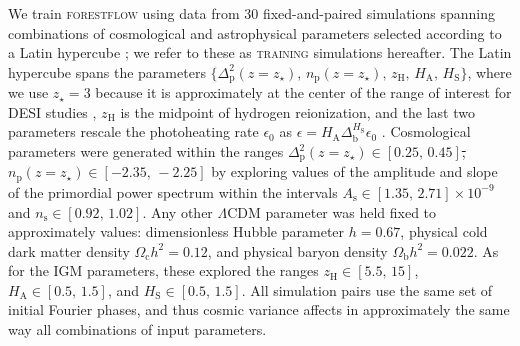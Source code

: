 \documentclass{aa}
\newcommand{\forestflow}{\textsc{forestflow}\xspace}
\newcommand{\lacehc}{\textsc{training}\xspace}
\providecommand{\DIFaddtex}[1]{{\protect\color{blue}\uwave{#1}}} %
\providecommand{\DIFdeltex}[1]{{\protect\color{red}\sout{#1}}}                      %
\providecommand{\DIFaddbegin}{} %
\providecommand{\DIFaddend}{} %
\providecommand{\DIFdelbegin}{} %
\providecommand{\DIFdelend}{} %
\providecommand{\DIFadd}[1]{\texorpdfstring{\DIFaddtex{#1}}{#1}} %
\providecommand{\DIFdel}[1]{\texorpdfstring{\DIFdeltex{#1}}{}} %
\newcommand{\DIFscaledelfig}{0.5}
\newlength{\DIFdelgraphicswidth} %
\newlength{\DIFdelgraphicsheight} %
\newcommand{\DIFaddincludegraphics}[2][]{{\color{blue}\fbox{\DIFOincludegraphics[#1]{#2}}}} %
\newcommand{\DIFdelincludegraphics}[2][]{%
\sbox{\DIFdelgraphicsbox}{\DIFOincludegraphics[#1]{#2}}%
\settoboxwidth{\DIFdelgraphicswidth}{\DIFdelgraphicsbox} %
\settoboxtotalheight{\DIFdelgraphicsheight}{\DIFdelgraphicsbox} %
\scalebox{\DIFscaledelfig}{%
\parbox[b]{\DIFdelgraphicswidth}{\usebox{\DIFdelgraphicsbox}\\[-\baselineskip] \rule{\DIFdelgraphicswidth}{0em}}\llap{\resizebox{\DIFdelgraphicswidth}{\DIFdelgraphicsheight}{%
\setlength{\unitlength}{\DIFdelgraphicswidth}%
\begin{picture}(1,1)%
\thicklines\linethickness{2pt} %
{\color[rgb]{1,0,0}\put(0,0){\framebox(1,1){}}}%
{\color[rgb]{1,0,0}\put(0,0){\line( 1,1){1}}}%
{\color[rgb]{1,0,0}\put(0,1){\line(1,-1){1}}}%
\end{picture}%
}\hspace*{3pt}}} %
} %
\DeclareRobustCommand{\DIFaddbegin}{\DIFOaddbegin \let\includegraphics\DIFaddincludegraphics} %
\DeclareRobustCommand{\DIFaddend}{\DIFOaddend \let\includegraphics\DIFOincludegraphics} %
\DeclareRobustCommand{\DIFdelbegin}{\DIFOdelbegin \let\includegraphics\DIFdelincludegraphics} %
\DeclareRobustCommand{\DIFdelend}{\DIFOaddend \let\includegraphics\DIFOincludegraphics} %
\begin{document}
We train \forestflow using data from 30 fixed-and-paired simulations spanning combinations of cosmological and astrophysical parameters selected according to a Latin hypercube \citep{mckay1979ComparisonThreeMethods}; we refer to these as \lacehc simulations hereafter. The Latin hypercube spans the parameters \DIFdelbegin \DIFdel{$\{\Delta^2_\mathrm{p}(z=z_\star),\, n_\mathrm{p}(z=z_\star),\, z_\mathrm{H},\, H_\mathrm{A},\, H_\mathrm{S}\}$}\DIFdelend \DIFaddbegin \DIFadd{$\{\Delta^2_\mathrm{p}(z=3),\, n_\mathrm{p}(z=3),\, z_\mathrm{H},\, H_\mathrm{A},\, H_\mathrm{S}\}$}\DIFaddend , where we use \DIFdelbegin \DIFdel{$z_\star=3$ }\DIFdelend \DIFaddbegin \DIFadd{$z=3$ }\DIFaddend because it is approximately at the center of the range of interest for DESI studies \citep{ravoux2023DarkEnergySpectroscopica, karacayli2024Optimal1DLy}, $z_\mathrm{H}$ is the midpoint of hydrogen reionization, and the last two parameters rescale the  photoheating rate $\epsilon_0$ as $\epsilon = H_\mathrm{A} \Delta_\mathrm{b}^{H_\mathrm{S}} \epsilon_0$ \citep{onorbe2017SelfconsistentModelingReionization}. Cosmological parameters were generated within the ranges \DIFdelbegin \DIFdel{$\Delta^2_\mathrm{p}(z=z_\star) \in [0.25,\, 0.45]$, $n_\mathrm{p}(z=z_\star) \in [-2.35,\, -2.25]$ }\DIFdelend \DIFaddbegin \DIFadd{$\Delta^2_\mathrm{p}(z=3) \in [0.25,\, 0.45]$, $n_\mathrm{p}(z=3) \in [-2.35,\, -2.25]$ }\DIFaddend by exploring values of the amplitude and slope of the primordial power spectrum within the intervals $A_\mathrm{s} \in [1.35,\, 2.71]\times 10^{-9}$ and $n_\mathrm{s} \in [0.92,\, 1.02]$. Any other $\Lambda$CDM parameter was held fixed to approximately \citet{planckcollaboration2020Planck2018Resultsa} values: dimensionless Hubble parameter $h=0.67$, physical cold dark matter density $\Omega_\mathrm{c} h^2=0.12$, and physical baryon density $\Omega_\mathrm{b} h^2=0.022$. As for the IGM parameters, these explored the ranges $z_\mathrm{H}\in[5.5,\,15]$, $H_\mathrm{A}\in[0.5,\,1.5]$, and $H_\mathrm{S}\in[0.5,\,1.5]$. All simulation pairs use the same set of initial Fourier phases, and thus cosmic variance affects in approximately the same way all combinations of input parameters.
\end{document}
